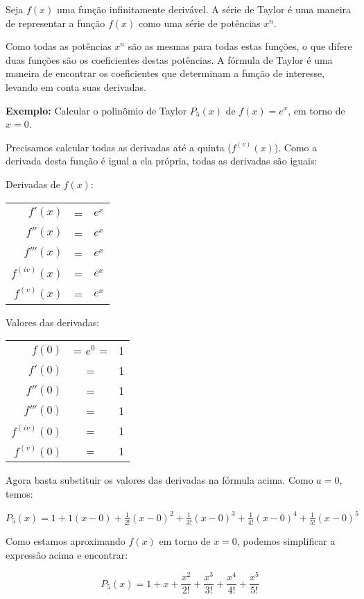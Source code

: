 \documentclass[a4paper]{article}
\begin{document}
Seja $f(x)$ uma função infinitamente derivável.
A série de Taylor é uma maneira de representar a função $f(x)$ como uma série de potências $x^n$.

Como todas as potências $x^n$ são as mesmas para todas estas funções, o que difere duas funções são os coeficientes destas potências.
A fórmula de Taylor é uma maneira de encontrar os coeficientes que determinam a função de interesse, levando em conta suas derivadas.

{\bf Exemplo:} Calcular o polinômio de Taylor $P_5(x)$ de $f(x)=e^x$, em torno de $x=0$.

Precisamos calcular todas as derivadas até a quinta ($f^{(v)}(x)$).
Como a derivada desta função é igual a ela própria, todas as derivadas são iguais:

\begin{multicols}{2}

Derivadas de $f(x)$:

  \begin{tabular}{rcl}
    $f'(x)$ &=& $e^x$\\
    $f''(x)$ &=& $e^x$\\
    $f'''(x)$ &=& $e^x$\\
    $f^{(iv)}(x)$ &=& $e^x$\\
    $f^{(v)}(x)$ &=& $e^x$\\
  \end{tabular}

  \columnbreak

Valores das derivadas:

  \begin{tabular}{rcl}
    $f(0)$ &= $e^0$ =& 1\\
    $f'(0)$ &=& 1\\
    $f''(0)$ &=& 1\\
    $f'''(0)$ &=& 1\\
    $f^{(iv)}(0)$ &=& 1\\
    $f^{(v)}(0)$ &=& 1\\
  \end{tabular}
\end{multicols}

Agora basta substituir os valores das derivadas na fórmula acima.
Como $a=0$, temos:

$P_5(x) = 1+ 1(x-0) + \frac{1}{2!}(x-0)^2 + \frac{1}{3!}(x-0)^3 + \frac{1}{4!}(x-0)^4 + \frac{1}{5!}(x-0)^5$

Como estamos aproximando $f(x)$ em torno de $x=0$, podemos simplificar a expressão acima e encontrar:

\begin{displaymath}
  P_5(x) = 1+ x + \frac{x^2}{2!} + \frac{x^3}{3!} + \frac{x^4}{4!} + \frac{x^5}{5!}
\end{displaymath}
\end{document}
